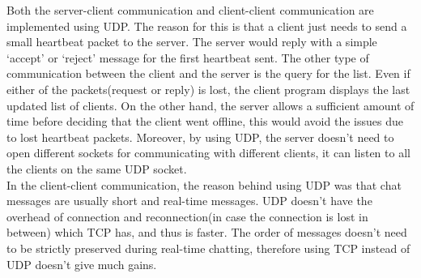 \documentclass{article}
\begin{document}
	Both the server-client communication and client-client communication are implemented using UDP. The reason for this is that a client just needs to send a small heartbeat packet to the server. The server would reply with a simple `accept' or `reject' message for the first heartbeat sent. The other type of communication between the client and the server is the query for the list. Even if either of the packets(request or reply) is lost, the client program displays the last updated list of clients. On the other hand, the server allows a sufficient amount of time before deciding that the client went offline, this would avoid the issues due to lost heartbeat packets. Moreover, by using UDP, the server doesn't need to open different sockets for communicating with different clients, it can listen to all the clients on the same UDP socket.\\

	In the client-client communication, the reason behind using UDP was that chat messages are usually short and real-time messages. UDP doesn't have the overhead of connection and reconnection(in case the connection is lost in between) which TCP has, and thus is faster. The order of messages doesn't need to be strictly preserved during real-time chatting, therefore using TCP instead of UDP doesn't give much gains.
\end{document}
